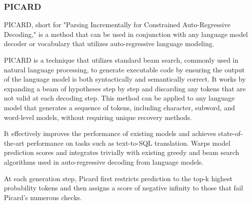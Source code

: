 \subsubsection*{PICARD}



PICARD\cite{Scholak2021:PICARD}, short for "Parsing Incrementally for Constrained Auto-Regressive Decoding," is a method that can be used in conjunction with any language model decoder or vocabulary that utilizes auto-regressive language modeling.

PICARD is a technique that utilizes standard beam search, commonly used in natural language processing, to generate executable code by ensuring the output of the language model is both syntactically and semantically correct. It works by expanding a beam of hypotheses step by step and discarding any tokens that are not valid at each decoding step. This method can be applied to any language model that generates a sequence of tokens, including character, subword, and word-level models, without requiring unique recovery methods.

It effectively improves the performance of existing models and achieves state-of-the-art performance on tasks such as text-to-SQL translation.
Warps model prediction scores and integrates trivially with existing greedy and beam search algorithms used in auto-regressive decoding from language models.

At each generation step, Picard first restricts prediction to the top-k highest probability tokens and then assigns a score of negative infinity to those that fail Picard's numerous checks.

